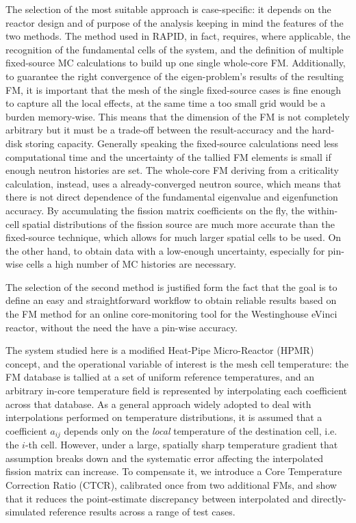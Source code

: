 \documentclass{style/nseJournal}
\begin{document}
The selection of the most suitable approach is case-specific: it depends on the reactor design and of purpose of the analysis keeping in mind the features of the two methods. The method used in RAPID, in fact, requires, where applicable, the recognition of the fundamental cells of the system, and the definition of multiple fixed-source MC calculations to build up one single whole-core FM. Additionally, to guarantee the right convergence of the eigen-problem's results of the resulting FM, it is important that the mesh of the single fixed-source cases is fine enough to capture all the local effects, at the same time a too small grid would be a burden memory-wise. This means that the dimension of the FM is not completely arbitrary but it must be a trade-off between the result-accuracy and the hard-disk storing capacity. Generally speaking the fixed-source calculations need less computational time and the uncertainty of the tallied FM elements is small if enough neutron histories are set. 
The whole-core FM deriving from a criticality calculation, instead, uses a already-converged neutron source, which means that there is not direct dependence of the fundamental eigenvalue and eigenfunction accuracy. By
accumulating the fission matrix coefficients on the fly, the
within-cell spatial distributions of the fission source are much
more accurate than the fixed-source technique, which allows
for much larger spatial cells to be used. On the other hand, to obtain data with a low-enough uncertainty, especially for pin-wise cells a high number of MC histories are necessary.             

The selection of the second method is justified form the fact that the goal is to define an easy and straightforward workflow to obtain reliable results based on the FM method for an online core-monitoring tool for the Westinghouse eVinci reactor, without the need the have a pin-wise accuracy. 

The system studied here is a modified Heat-Pipe Micro-Reactor (HPMR) concept, and the operational variable of interest is the mesh cell temperature: the FM database is tallied at a set of uniform reference temperatures, and an arbitrary in-core temperature field is represented by interpolating each coefficient across that database. As a general approach widely adopted to deal with interpolations performed on temperature distributions, it is assumed that a coefficient $a_{ij}$ depends only on the \emph{local} temperature of the destination cell, i.e. the $i$-th cell. However, under a large, spatially sharp temperature gradient that assumption breaks down and the systematic error affecting the interpolated fission matrix can increase. To compensate it, we introduce a Core Temperature Correction Ratio (CTCR), calibrated once from two additional FMs, and show that it reduces the point-estimate discrepancy between interpolated and directly-simulated reference results across a range of test cases.
\end{document}
